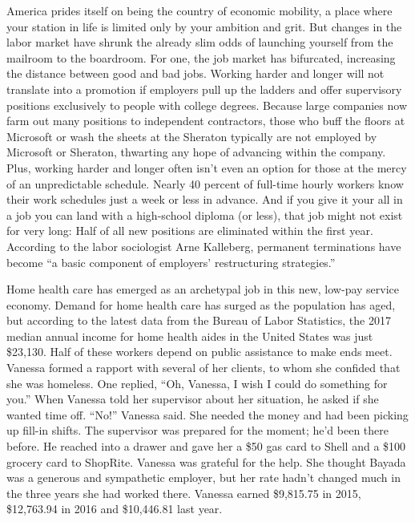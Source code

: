 America prides itself on being the country of economic mobility, a place
where your station in life is limited only by your ambition and grit.
But changes in the labor market have shrunk the already slim odds of
launching yourself from the mailroom to the boardroom. For one, the job
market has bifurcated, increasing the distance between good and bad
jobs. Working harder and longer will not translate into a promotion if
employers pull up the ladders and offer supervisory positions
exclusively to people with college degrees. Because large companies now
farm out many positions to independent contractors, those who buff the
floors at Microsoft or wash the sheets at the Sheraton typically are not
employed by Microsoft or Sheraton, thwarting any hope of advancing
within the company. Plus, working harder and longer often isn't even an
option for those at the mercy of an unpredictable schedule. Nearly 40
percent of full-time hourly workers know their work schedules just a
week or less in advance. And if you give it your all in a job you can
land with a high-school diploma (or less), that job might not exist for
very long: Half of all new positions are eliminated within the first
year. According to the labor sociologist Arne Kalleberg, permanent
terminations have become ``a basic component of employers' restructuring
strategies.''

Home health care has emerged as an archetypal job in this new, low-pay
service economy. Demand for home health care has surged as the
population has aged, but according to the latest data from the Bureau of
Labor Statistics, the 2017 median annual income for home health aides in
the United States was just \$23,130. Half of these workers depend on
public assistance to make ends meet. Vanessa formed a rapport with
several of her clients, to whom she confided that she was homeless. One
replied, ``Oh, Vanessa, I wish I could do something for you.'' When
Vanessa told her supervisor about her situation, he asked if she wanted
time off. ``No!'' Vanessa said. She needed the money and had been
picking up fill-in shifts. The supervisor was prepared for the moment;
he'd been there before. He reached into a drawer and gave her a \$50 gas
card to Shell and a \$100 grocery card to ShopRite. Vanessa was grateful
for the help. She thought Bayada was a generous and sympathetic
employer, but her rate hadn't changed much in the three years she had
worked there. Vanessa earned \$9,815.75 in 2015, \$12,763.94 in 2016 and
\$10,446.81 last year.

